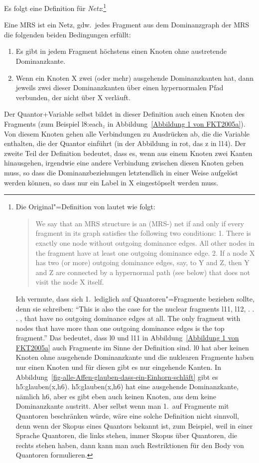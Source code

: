 Es folgt eine Definition für \emph{Netz}:\footnote{
  Die Original"=Definition von \citet[]{FKT2005a} lautet wie folgt:
\begin{quote}
We say that an MRS structure is an (MRS-) net if and only if every fragment
in its graph satisfies the following two conditions:
1. There is exactly one node without outgoing dominance edges. All other
nodes in the fragment have at least one outgoing dominance edge.
2. If a node X has two (or more) outgoing dominance edges, say, to Y and Z,
then Y and Z are connected by a hypernormal path (see below) that does not
visit the node X itself.
\end{quote}
Ich vermute, dass sich 1.\ lediglich auf Quantoren"=Fragmente beziehen sollte, denn sie schreiben: "`This is also the case for the nuclear fragments l11, l12, . . . , that have no outgoing
dominance edges at all. The only fragment with nodes that have more than one outgoing dominance
edges is the top fragment."' Das bedeutet, dass l0 und l11 in Abbildung~\ref{Abbildung 1 von
  FKT2005a} auch Fragmente im Sinne der Definition
sind. l0 hat aber keinen Knoten ohne ausgehende Dominanzkante und die nuklearen Fragmente haben nur
einen Knoten und für diesen gibt es nur eingehende Kanten. In Abbildung~\ref{fig-alle-Affen-glauben-dass-ein-Einhorn-schläft} gibt es
h5:glauben(x,h6). h5:glauben(x,h6) hat eine ausgehende Dominanzkante, nämlich h6, aber es gibt eben
auch keinen Knoten, aus dem keine Dominanzkante austritt. Aber selbst wenn man 1.\ auf Fragmente mit
Quantoren beschränken würde, wäre eine solche Definition nicht sinnvoll, denn wenn der Skopus eines
Quantors bekannt ist, zum Beispiel, weil in einer Sprache Quantoren, die links stehen, immer Skopus
über Quantoren, die rechts stehen haben, dann kann man auch Restriktionen für den Body von Quantoren
formulieren.  
}
\begin{definition}
Eine MRS ist ein Netz, gdw.\ jedes Fragment aus dem Dominanzgraph der MRS die folgenden beiden
Bedingungen erfüllt:
\begin{enumerate}
\item Es gibt in jedem Fragment höchstens einen Knoten ohne austretende Dominanzkante.
\item Wenn ein Knoten X zwei (oder mehr) ausgehende Dominanzkanten hat, dann jeweils zwei dieser
  Dominanzkanten über einen hypernormalen Pfad verbunden, der nicht über X verläuft.
\end{enumerate}
\end{definition}
Der Quantor+Variable selbst bildet in dieser Definition auch einen Knoten des Fragments (zum
Beispiel l8:each$_z$ in Abbildung~\ref{Abbildung 1 von FKT2005a}). 
Von diesem
Knoten gehen alle Verbindungen zu Ausdrücken ab, die die Variable enthalten, die der Quantor
einführt (in der Abbildung in rot, das z in l14). Der zweite Teil der Definition bedeutet, dass es,
wenn aus einem Knoten zwei Kanten hinausgehen, irgendwie eine andere Verbindung zwischen diesen
Knoten geben muss, so dass die Dominanzbeziehungen letztendlich in einer Weise aufgelöst werden
können, so dass nur ein Label in X eingestöpselt werden muss. 

